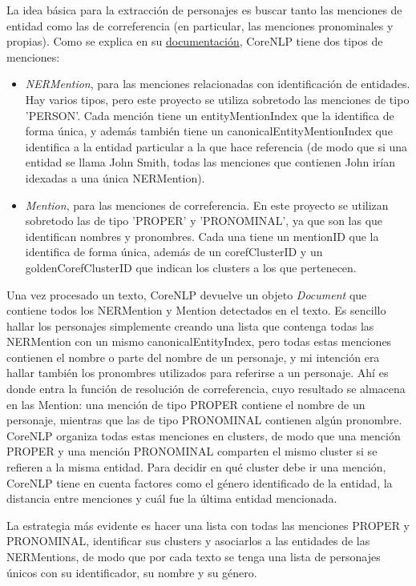 \documentclass{pre-tfg}
\begin{document}
La idea básica para la extracción de personajes es buscar tanto las menciones de entidad como las de correferencia (en particular, las menciones pronominales y propias).
Como se explica en su \href{https://github.com/stanfordnlp/stanza/blob/master/doc/CoreNLP.proto}{documentación}, CoreNLP tiene dos tipos de menciones:
\begin{itemize}
	\item \textit{NERMention}, para las menciones relacionadas con identificación de entidades. Hay varios tipos, pero este proyecto se utiliza sobretodo las menciones de tipo 'PERSON'. Cada mención tiene un entityMentionIndex que la identifica de forma única, y además también tiene un canonicalEntityMentionIndex que identifica a la entidad particular a la que hace referencia (de modo que si una entidad se llama John Smith, todas las menciones que contienen John irían idexadas a una única NERMention).
	\item \textit{Mention}, para las menciones de correferencia. En este proyecto se utilizan sobretodo las de tipo 'PROPER' y 'PRONOMINAL', ya que son las que identifican nombres y pronombres. Cada una tiene un mentionID que la identifica de forma única, además de un corefClusterID y un goldenCorefClusterID que indican los clusters a los que pertenecen.
\end{itemize}

Una vez procesado un texto, CoreNLP devuelve un objeto \textit{Document} que contiene todos los NERMention y Mention detectados en el texto. Es sencillo hallar los personajes simplemente creando una lista que contenga todas las NERMention con un mismo canonicalEntityIndex, pero todas estas menciones contienen el nombre o parte del nombre de un personaje, y mi intención era hallar también los pronombres utilizados para referirse a un personaje. Ahí es donde entra la función de resolución de correferencia, cuyo resultado se almacena en las Mention: una mención de tipo PROPER contiene el nombre de un personaje, mientras que las de tipo PRONOMINAL contienen algún pronombre. CoreNLP organiza todas estas menciones en clusters, de modo que una mención PROPER y una mención PRONOMINAL comparten el mismo cluster si se refieren a la misma entidad. Para decidir en qué cluster debe ir una mención, CoreNLP tiene en cuenta factores como el género identificado de la entidad, la distancia entre menciones y cuál fue la última entidad mencionada.

La estrategia más evidente es hacer una lista con todas las menciones PROPER y PRONOMINAL, identificar sus clusters y asociarlos a las entidades de las NERMentions, de modo que por cada texto se tenga una lista de personajes únicos con su identificador, su nombre y su género.
\end{document}
